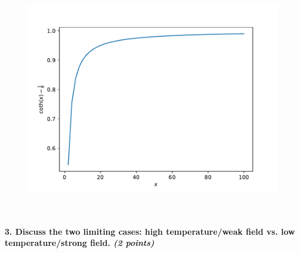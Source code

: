     \begin{figure}[h!]
        \centering
        \includegraphics[width=.6\textwidth]{./figures/magnetization.pdf}
    \end{figure} \ \\ 

\paragraph{3. Discuss the two limiting cases: 
    high temperature/weak field vs. 
    low temperature/strong field.
    \textit{(2 points)}
} \ \\
    \\
